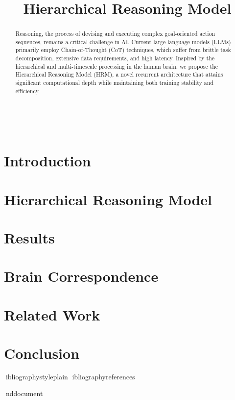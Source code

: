 \documentclass[11pt,twocolumn]{article}
\title{Hierarchical Reasoning Model}
\date{}
\begin{document}
\maketitle

\begin{abstract}
Reasoning, the process of devising and executing complex goal-oriented action sequences,
remains a critical challenge in AI. Current large language models (LLMs) primarily employ
Chain-of-Thought (CoT) techniques, which suffer from brittle task decomposition, extensive
data requirements, and high latency. Inspired by the hierarchical and multi-timescale
processing in the human brain, we propose the Hierarchical Reasoning Model (HRM), a novel
recurrent architecture that attains significant computational depth while maintaining both
training stability and efficiency.
\end{abstract}

\section{Introduction}

\section{Hierarchical Reasoning Model}

\section{Results}

\section{Brain Correspondence}

\section{Related Work}

\section{Conclusion}

ibliographystyle{plain}
ibliography{references}

nd{document}
\end{document}
